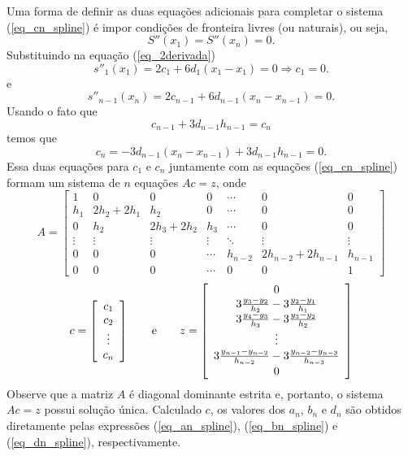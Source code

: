 Uma forma de definir as duas equações adicionais para completar o sistema (\ref{eq_cn_spline}) é impor condições de fronteira livres (ou naturais), ou seja,
\begin{equation}
S''(x_1)=S''(x_n)=0.
\end{equation}
Substituindo na equação (\ref{eq_2derivada})
$$
s''_1(x_1)=2c_1+6d_1(x_1-x_1)=0 \Longrightarrow c_1=0.
$$
e
$$
s''_{n-1}(x_n)=2c_{n-1}+6d_{n-1}(x_{n}-x_{n-1})=0 .
$$
Usando o fato que
$$
c_{n-1}+3d_{n-1}h_{n-1}=c_{n}
$$
temos que
$$
c_n=-3d_{n-1}(x_{n}-x_{n-1})+3d_{n-1}h_{n-1}=0.
$$
Essa duas equações para $c_1$ e $c_n$ juntamente com as equações (\ref{eq_cn_spline}) formam um sistema de $n$ equações $Ac=z$, onde
\begin{equation}
A=\left[\begin{array}{ccccccc}
1 &0&0&0 &\cdots&0&0\\
h_1&2h_2+2h_{1}&h_2&0&\cdots&0&0\\
0&h_2&2h_3+2h_{2}&h_3&\cdots&0&0\\
\vdots&\vdots&\vdots&\vdots&\ddots&\vdots&\vdots\\
0&0&0&\cdots&h_{n-2} & 2h_{n-2}+2h_{n-1}&h_{n-1}\\
0&0&0&\cdots &0&0&1
\end{array}\right]  
\end{equation}
\begin{equation}
c = \left[\begin{array}{c}
c_1\\
c_2\\
\vdots\\
c_n
\end{array}\right]\qquad \hbox{e}\qquad
z = \left[\begin{array}{c}
0\\
3\frac{y_{3}-y_2}{h_2}-3\frac{y_{2}-y_{1}}{h_{1}}\\
3\frac{y_{4}-y_3}{h_3}-3\frac{y_{3}-y_{2}}{h_{2}}\\
\vdots\\
3\frac{y_{n-1}-y_{n-2}}{h_{n-2}}-3\frac{y_{n-2}-y_{n-3}}{h_{n-3}}\\
0
\end{array}\right]
\end{equation}
Observe que a matriz $A$ é diagonal dominante estrita e, portanto, o sistema $Ac=z$ possui solução única. Calculado $c$, os valores dos $a_n$, $b_n$ e $d_n$ são obtidos diretamente pelas expressões (\ref{eq_an_spline}), (\ref{eq_bn_spline}) e (\ref{eq_dn_spline}), respectivamente.


